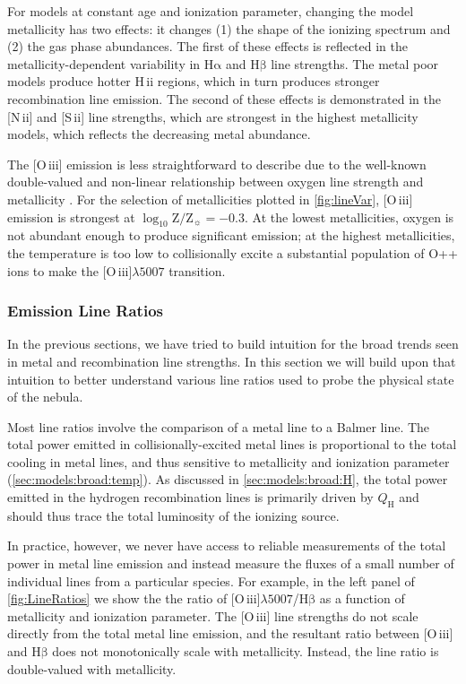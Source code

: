 \documentclass[linenumbers, tighten, trackchanges]{aastex61}%
\newcommand{\Fig}[1]{\autoref{fig:#1}}
\newcommand{\Sec}[1]{\autoref{sec:#1}}
\newcommand{\logten}{\ensuremath{\log_{10}}}
\newcommand{\nii}{[N\,{\sc ii}]\xspace}
\newcommand{\sii}{[S\,{\sc ii}]\xspace}
\newcommand{\oiii}{[O\,{\sc iii}]\xspace}
\newcommand{\ha}{\ensuremath{\mathrm{H\alpha}}}
\newcommand{\hb}{\ensuremath{\mathrm{H\beta}}}
\newcommand{\hii}{H\,{\sc ii}\xspace}
\newcommand\lam[1]{\ensuremath{\lambda #1}}
\newcommand{\logZeq}[1]{\ensuremath{\logten \mathrm{Z}/\mathrm{Z}_{\sun} = #1}}
\newcommand{\QH}{\ensuremath{Q_{\mathrm{H}}}}
\newcommand\oiiihb{\oiii{}\lam{5007}/\hb{}}
\begin{document}
For models at constant age and ionization parameter, changing the model metallicity has two effects: it changes (1) the shape of the ionizing spectrum and (2) the gas phase abundances. The first of these effects is reflected in the metallicity-dependent variability in \ha{} and \hb{} line strengths. The metal poor models produce hotter \hii regions, which in turn produces stronger recombination line emission. The second of these effects is demonstrated in the \nii{} and \sii{} line strengths, which are strongest in the highest metallicity models, which reflects the decreasing metal abundance.

The \oiii{} emission is less straightforward to describe due to the well-known double-valued and non-linear relationship between oxygen line strength and metallicity \citep{Pilyugin05, Kewley08}. For the selection of metallicities plotted in \Fig{lineVar}, \oiii{} emission is strongest at \logZeq{-0.3}. At the lowest metallicities, oxygen is not abundant enough to produce significant emission; at the highest metallicities, the temperature is too low to collisionally excite a substantial population of O++ ions to make the \oiii{}\lam{5007} transition. 

\subsubsection{Emission Line Ratios}\label{sec:models:lines:ratios}

In the previous sections, we have tried to build intuition for the broad trends seen in metal and recombination line strengths. In this section we will build upon that intuition to better understand  various line ratios used to probe the physical state of the nebula.

Most line ratios involve the comparison of a metal line to a Balmer line. The total power emitted in collisionally-excited metal lines is proportional to the total cooling in metal lines, and thus sensitive to metallicity and ionization parameter (\Sec{models:broad:temp}). As discussed in \Sec{models:broad:H}, the total power emitted in the hydrogen recombination lines is primarily driven by \QH{} and should thus trace the total luminosity of the ionizing source. 

In practice, however, we never have access to reliable measurements of the total power in metal line emission and instead measure the fluxes of a small number of individual lines from a particular species. For example, in the left panel of \Fig{LineRatios} we show the the ratio of \oiiihb{} as a function of metallicity and ionization parameter. The \oiii{} line strengths do not scale directly from the total metal line emission, and the resultant ratio between \oiii{} and \hb{} does not monotonically scale with metallicity. Instead, the line ratio is double-valued with metallicity.
\end{document}
